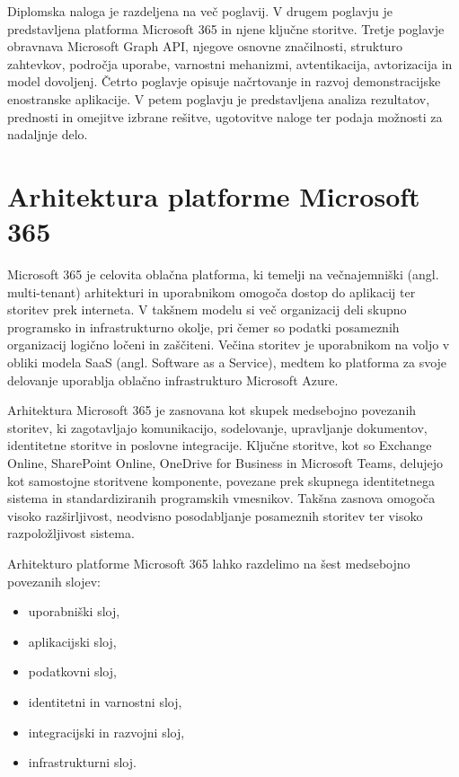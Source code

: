 \documentclass[a4paper, 12pt]{book}
\begin{document}
Diplomska naloga je razdeljena na več poglavij.
V drugem poglavju je predstavljena platforma Microsoft 365 in njene ključne storitve.
Tretje poglavje obravnava Microsoft Graph API, njegove osnovne značilnosti, strukturo zahtevkov, področja uporabe, varnostni mehanizmi, avtentikacija, avtorizacija in model dovoljenj.
Četrto poglavje opisuje načrtovanje in razvoj demonstracijske enostranske aplikacije.
V petem poglavju je predstavljena analiza rezultatov, prednosti in omejitve izbrane rešitve, ugotovitve naloge ter podaja možnosti za nadaljnje delo.


\chapter{Arhitektura platforme Microsoft 365}

Microsoft 365 je celovita oblačna platforma, ki temelji na večnajemniški (angl. multi-tenant) arhitekturi in uporabnikom omogoča dostop do aplikacij ter storitev prek interneta.
V takšnem modelu si več organizacij deli skupno programsko in infrastrukturno okolje, pri čemer so podatki posameznih organizacij logično ločeni in zaščiteni.
Večina storitev je uporabnikom na voljo v obliki modela SaaS (angl. Software as a Service), medtem ko platforma za svoje delovanje uporablja oblačno infrastrukturo Microsoft Azure.

Arhitektura Microsoft 365 je zasnovana kot skupek medsebojno povezanih storitev, ki zagotavljajo komunikacijo, sodelovanje, upravljanje dokumentov, identitetne storitve in poslovne integracije.
Ključne storitve, kot so Exchange Online, SharePoint Online, OneDrive for Business in Microsoft Teams, delujejo kot samostojne storitvene komponente, povezane prek skupnega identitetnega sistema in standardiziranih programskih vmesnikov.
Takšna zasnova omogoča visoko razširljivost, neodvisno posodabljanje posameznih storitev ter visoko razpoložljivost sistema.

Arhitekturo platforme Microsoft 365 lahko razdelimo na šest medsebojno povezanih slojev:

\begin{itemize}
\item uporabniški sloj,
\item aplikacijski sloj,
\item podatkovni sloj,
\item identitetni in varnostni sloj,
\item integracijski in razvojni sloj,
\item infrastrukturni sloj.
\end{itemize}
\end{document}
